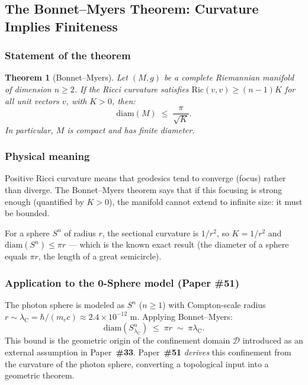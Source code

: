 \documentclass[12pt,letterpaper]{article}
\newcommand{\paperno}[1]{\textbf{\#{}#1}}
\newcommand{\lambdaC}{\lambda_{\mathrm{C}}}
\newtheorem{theorem}{Theorem}[section]
\begin{document}
\subsection{The Bonnet--Myers Theorem: Curvature Implies Finiteness}
\label{subsec:bonnet}

\subsubsection{Statement of the theorem}

\begin{theorem}[Bonnet--Myers]
Let $(M, g)$ be a complete Riemannian manifold of dimension $n \geq 2$.
If the Ricci curvature satisfies $\mathrm{Ric}(v,v) \geq (n-1)K$ for all unit
vectors $v$, with $K > 0$, then:
\begin{equation}
\mathrm{diam}(M) \;\leq\; \frac{\pi}{\sqrt{K}}.
\end{equation}
In particular, $M$ is compact and has finite diameter.
\end{theorem}

\subsubsection{Physical meaning}

Positive Ricci curvature means that geodesics tend to converge (focus) rather than
diverge. The Bonnet--Myers theorem says that if this focusing is strong enough
(quantified by $K > 0$), the manifold cannot extend to infinite size: it must
be bounded.

For a sphere $S^n$ of radius $r$, the sectional curvature is $1/r^2$, so
$K = 1/r^2$ and $\mathrm{diam}(S^n) \leq \pi r$ --- which is the known exact result
(the diameter of a sphere equals $\pi r$, the length of a great semicircle).

\subsubsection{\texorpdfstring{Application to the 0-Sphere model (Paper \#51)}{Application to the 0-Sphere model (Paper \#51)}}

The photon sphere is modeled as $S^n$ ($n\geq 1$) with Compton-scale radius
$r\sim\lambdaC = \hbar/(m_e c) \approx 2.4\times10^{-12}$ m.
Applying Bonnet--Myers:
\begin{equation}
\mathrm{diam}(S^n_{\lambdaC}) \;\leq\; \pi r \;\sim\; \pi\lambdaC.
\label{eq:bonnet_bound}
\end{equation}
This bound is the geometric origin of the confinement domain $\mathcal{D}$ introduced
as an external assumption in Paper~\paperno{33}.
Paper~\paperno{51} \emph{derives} this confinement from the curvature of the photon
sphere, converting a topological input into a geometric theorem.
\end{document}
